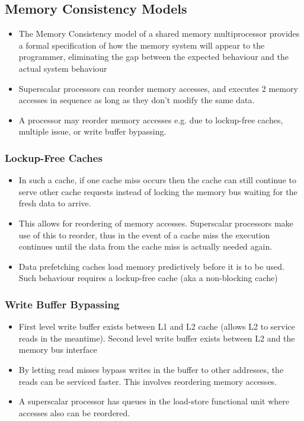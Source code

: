 \documentclass{article}
\begin{document}
\subsection{Memory Consistency Models}
\begin{itemize}
    \item The Memory Consistency model of a shared memory multiprocessor provides a formal specification of how the memory system will appear to the programmer, eliminating the gap between the expected behaviour and the actual system behaviour
    
    \item Superscalar processors can reorder memory accesses, and executes 2 memory accesses in sequence as long as they don't modify the same data. 
    
    \item A processor may reorder memory accesses e.g. due to lockup-free caches, multiple issue, or write buffer bypassing.
\end{itemize}

\subsubsection{Lockup-Free Caches}
\begin{itemize}
    \item In such a cache, if one cache miss occurs then the cache can still continue to serve other cache requests instead of locking the memory bus waiting for the fresh data to arrive. 
    
    \item This allows for reordering of memory accesses. Superscalar processors make use of this to reorder, thus in the event of a cache miss the execution continues until the data from the cache miss is actually needed again.
    
    \item Data prefetching caches load memory predictively before it is to be used. Such behaviour requires a lockup-free cache (aka a non-blocking cache)
\end{itemize}

\subsubsection{Write Buffer Bypassing}
\begin{itemize}
    \item First level write buffer exists between L1 and L2 cache (allows L2 to service reads in the meantime). Second level write buffer exists between L2 and the memory bus interface
    
    \item By letting read misses bypass writes in the buffer to other addresses, the reads can be serviced faster. This involves reordering memory accesses.
    
    \item A superscalar processor has queues in the load-store functional unit where accesses also can be reordered.
\end{itemize}
\end{document}
